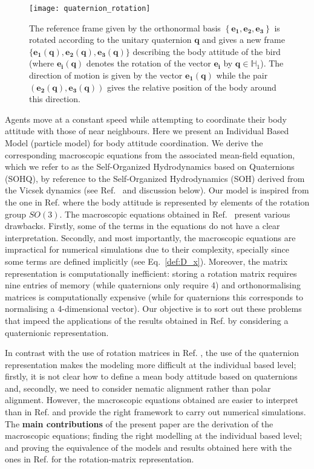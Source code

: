 \documentclass[12pt]{article}
\newcommand{\lp}{\left(}
\newcommand{\rp}{\right)}
\newcommand{\vezero}{\mathbf{e_{1}}}
\newcommand{\unitq}{{\mathbb{H}_1}}
\newcommand{\q}{\mathbf{q}}
\begin{document}
 
 \begin{figure}
 \centering
\texttt{[image: quaternion\_rotation]}  
 \caption{The reference frame given by the orthonormal basis  $\left\{\vezero, \mathbf{e_2}, \mathbf{e_3}\right\}$ is rotated according to the unitary quaternion $\q$ and gives a new frame $\{\vezero(\q), \mathbf{e_2}(\q), \mathbf{e_3}(\q)\}$ describing the body attitude of the bird (where $\mathbf{e_i}(\q)$ denotes the rotation of the vector $\mathbf{e_i}$ by $\q\in \unitq$). The direction of motion is given by the vector $\vezero(\q)$ while the pair $\lp\mathbf{e_2}(\q), \mathbf{e_3}(\q)\rp$ gives the relative position of the body around this direction. }
  \label{Fig:quaternion_explained}
 \end{figure}
 

 
Agents move at a constant speed while attempting to coordinate their body attitude with those of near neighbours. Here we present an Individual Based Model (particle model) for body attitude coordination. We derive the corresponding macroscopic equations from the associated mean-field equation, which we refer to as the Self-Organized Hydrodynamics  based on Quaternions (SOHQ), by reference to the Self-Organized Hydrodynamics (SOH) derived from the Vicsek dynamics (see Ref.~\cite{degond2008continuum} and discussion below). Our model is inspired from the one in Ref. \cite{bodyattitude} where the body attitude is represented by elements of the rotation group $SO(3)$. The macroscopic equations obtained in Ref.~\cite{bodyattitude} present various drawbacks. Firstly, some of the terms in the equations do not have a clear interpretation. Secondly, and  most importantly, the macroscopic equations are impractical for numerical simulations due to their complexity, specially since some terms are defined implicitly (see Eq.~\eqref{def:D_x}). Moreover, the matrix representation is computationally inefficient: storing a rotation matrix requires nine entries of memory (while quaternions only require 4) and orthonormalising matrices is computationally expensive (while for quaternions this corresponds to normalising a 4-dimensional vector). Our objective is to sort out these problems that impeed the applications of the results obtained in Ref. \cite{bodyattitude} by considering a quaternionic representation. 

In contrast with the use of rotation matrices in  Ref. \cite{bodyattitude}, the use of the quaternion representation makes the modeling more difficult at the individual based level; firstly, it is not clear how to define a mean body attitude based on quaternions and, secondly, we need to consider nematic alignment rather than polar alignment. However, 
 the macroscopic equations obtained are easier to interpret than in Ref. \cite{bodyattitude} and  provide the right framework to carry out numerical simulations. The \textbf{main contributions} of the present paper are the derivation of the macroscopic equations; finding the right modelling at the individual based level; and proving the equivalence of the models and results obtained here with the ones in Ref. \cite{bodyattitude} for the rotation-matrix representation.
\end{document}
